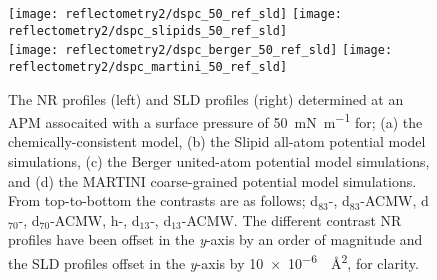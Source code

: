 %
%
\begin{figure}
    \centering
    \texttt{[image: reflectometry2/dspc\_50\_ref\_sld]}
    \texttt{[image: reflectometry2/dspc\_slipids\_50\_ref\_sld]}\\
    \texttt{[image: reflectometry2/dspc\_berger\_50\_ref\_sld]}
    \texttt{[image: reflectometry2/dspc\_martini\_50\_ref\_sld]}
    \caption{The NR profiles (left) and SLD profiles (right) determined at an APM assocaited with a surface pressure of \SI{50}{\milli\newton\per\meter} for; (a) the chemically-consistent model, (b) the Slipid all-atom potential model simulations, (c) the Berger united-atom potential model simulations, and (d) the MARTINI coarse-grained potential model simulations. From top-to-bottom the contrasts are as follows; d$_{83}$-, d$_{83}$-ACMW, d$_{70}$-, d$_{70}$-ACMW, h-, d$_{13}$-, d$_{13}$-ACMW. The different contrast NR profiles have been offset in the \emph{y}-axis by an order of magnitude and the SLD profiles offset in the \emph{y}-axis by \SI{10e-6}{\per\angstrom\squared}, for clarity.}
    \label{fig:dspcccref50}
\end{figure}
%

